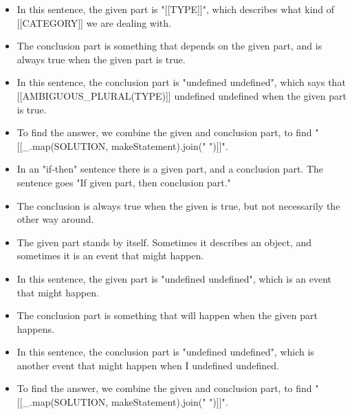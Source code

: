 \documentclass{article}
\begin{document}
\begin{itemize}
  \item In this sentence, the given part is "[[TYPE]]", which describes what kind of [[CATEGORY]] we are dealing with.
  \item The conclusion part is something that depends on the given part, and is always true when the given part is true.
  \item In this sentence, the conclusion part is "undefined undefined", which says that [[AMBIGUOUS\_PLURAL(TYPE)]] undefined undefined when the given part is true.
  \item To find the answer, we combine the given and conclusion part, to find "[[\_.map(SOLUTION, makeStatement).join(" ")]]".
  \item In an "if-then" sentence there is a given part, and a conclusion part. The sentence goes "If given part, then conclusion part."
  \item The conclusion is always true when the given is true, but not necessarily the other way around.
  \item The given part stands by itself. Sometimes it describes an object, and sometimes it is an event that might happen.
  \item In this sentence, the given part is "undefined undefined", which is an event that might happen.
  \item The conclusion part is something that will happen when the given part happens.
  \item In this sentence, the conclusion part is "undefined undefined", which is another event that might happen when I undefined undefined.
  \item To find the answer, we combine the given and conclusion part, to find "[[\_.map(SOLUTION, makeStatement).join(" ")]]".
\end{itemize}
\end{document}
